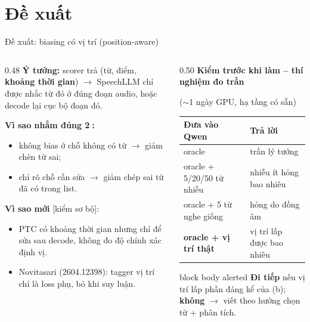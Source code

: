 \documentclass[aspectratio=169,xcolor=table]{beamer}
\newcommand{\hi}[1]{\textcolor{Primary}{\textbf{#1}}}
\newcommand{\src}[1]{{\tiny\color{TextGray}[#1]}}
\newcommand{\ra}{$\rightarrow$}
\begin{document}
\section{Đề xuất}
\begin{frame}{Đề xuất: biasing có vị trí (position-aware)}
\begin{columns}[T]
\begin{column}{0.48\textwidth}
\small
\textbf{Ý tưởng:} scorer trả (từ, điểm, \hi{khoảng thời gian}) \ra{} SpeechLLM chỉ được nhắc từ đó ở đúng đoạn audio, hoặc decode lại cục bộ đoạn đó.\par\vspace{0.2cm}
\textbf{Vì sao nhắm đúng \textcircled{\scriptsize 2}:}
\begin{itemize}\small
\item không bias ở chỗ không có từ \ra{} giảm chèn từ sai;
\item chỉ rõ chỗ cần sửa \ra{} giảm chép sai từ đã có trong list.
\end{itemize}
\textbf{Vì sao mới} \src{kiểm sơ bộ}:
\begin{itemize}\small
\item PTC có khoảng thời gian nhưng chỉ để sửa sau decode, không đo độ chính xác định vị.
\item Novitasari (2604.12398): tagger vị trí chỉ là loss phụ, bỏ khi suy luận.
\end{itemize}
\end{column}
\begin{column}{0.50\textwidth}
\small
\textbf{Kiểm trước khi làm -- thí nghiệm đo trần}\par($\sim$1 ngày GPU, hạ tầng có sẵn)\par\vspace{0.15cm}
\begin{tabular}{p{3.6cm}p{3.1cm}}
\toprule
Đưa vào Qwen & Trả lời\\
\midrule
oracle & trần lý tưởng\\
oracle + 5/20/50 từ nhiễu & nhiễu ít hỏng bao nhiêu\\
oracle + 5 từ nghe giống & hỏng do đồng âm\\
\textbf{oracle + vị trí thật} & vị trí lấp được bao nhiêu\\
\bottomrule
\end{tabular}
\vspace{0.2cm}
\begin{beamercolorbox}[sep=0.4em,rounded=true]{block body alerted}
\footnotesize\textbf{Đi tiếp} nếu vị trí lấp phần đáng kể của (b); \textbf{không} \ra{} viết theo hướng chọn từ + phân tích.
\end{beamercolorbox}
\end{column}
\end{columns}
\end{frame}
\end{document}
